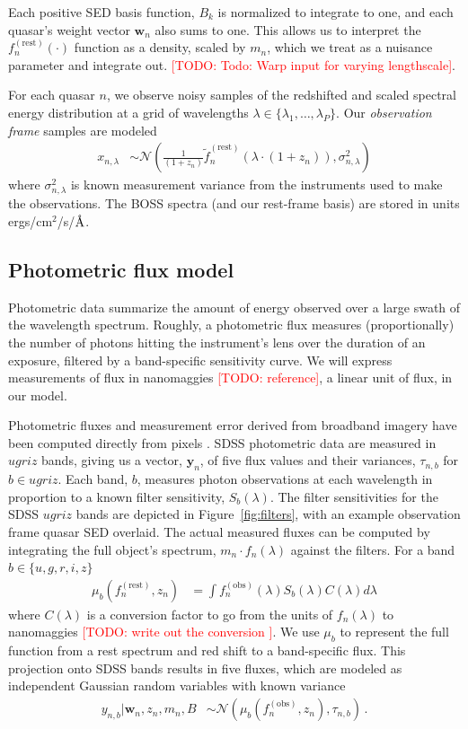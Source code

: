 \documentclass{article}
\newcommand{\angstrom}{\textup{\AA}}
\newcommand{\red}[1]{\textcolor{red}{[TODO: #1]}}
\begin{document}
Each positive SED basis function, $B_k$ is normalized to integrate to one, and each quasar's weight vector $\mathbf{w}_n$ also sums to one.  This allows us to interpret the $f^{(\text{rest})}_n(\cdot)$ function as a density, scaled by $m_n$, which we treat as a nuisance parameter and integrate out.  
\red{Todo: Warp input for varying lengthscale}.  

For each quasar $n$, we observe noisy samples of the redshifted and scaled spectral energy distribution at a grid of wavelengths $\lambda \in \{\lambda_1, \dots, \lambda_P \}$.  Our \emph{observation frame} samples are modeled
\begin{align}
  x_{n, \lambda} 
    &\sim \mathcal{N}\left( \frac{1}{(1 + z_n)} \tilde f_n^{(\text{rest})}( \lambda \cdot (1 + z_n) ), \sigma_{n,\lambda}^2 \right)
    \label{eq:spec} 
\end{align}
where $\sigma_{n, \lambda}^2$ is known measurement variance from the instruments
used to make the observations.
The BOSS spectra (and our rest-frame basis) are stored in units ergs/cm$^2$/s/$\angstrom$. 

\subsection{Photometric flux model }
Photometric data summarize the amount of energy observed over a large swath of the wavelength spectrum.  Roughly, a photometric flux measures (proportionally) the number of photons hitting the instrument's lens over the duration of an exposure, filtered by a band-specific sensitivity curve. 
We will express measurements of flux in nanomaggies \red{reference}, a linear unit of flux, in our model.

Photometric fluxes and measurement error derived from broadband imagery have been computed directly from pixels \cite{luptonsdss}.  
SDSS photometric data are measured in $ugriz$ bands, giving us a vector, $\mathbf{y}_n$, of five flux values and their variances, $\tau_{n, b}$ for $b \in ugriz$. 
Each band, $b$, measures photon observations at each wavelength in proportion to a known filter sensitivity, $S_{b}(\lambda)$. 
The filter sensitivities for the SDSS $ugriz$ bands are depicted in Figure~\ref{fig:filters}, with an example observation frame quasar SED overlaid.  The actual measured fluxes can be computed by integrating the full object's spectrum, $m_n \cdot f_n(\lambda)$ against the filters.  For a band $b \in \{u, g, r, i, z \}$
\begin{align}
  \mu_b(f_n^{(\text{rest})}, z_n) &= \int f^{(\text{obs})}_n(\lambda) S_b(\lambda) C(\lambda) d \lambda 
\end{align}
where $C(\lambda)$ is a conversion factor to go from the units of $f_n(\lambda)$ to nanomaggies \red{ write out the conversion }. We use $\mu_b$ to represent the full function from 
a rest spectrum and red shift to a band-specific flux. This projection onto SDSS bands results in five fluxes, which are modeled as independent Gaussian random variables with known variance
\begin{align}
  y_{n,b} | \mathbf{w}_n, z_n, m_n, B &\sim \mathcal{N}( \mu_b(f_n^{(\text{obs})}, z_n), \tau_{n,b} ) \, .
\end{align}
\end{document}
